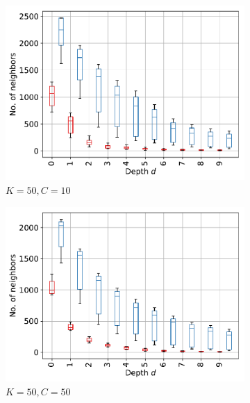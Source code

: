 \documentclass[11pt,onecolumn]{article}
\begin{document}
\begin{figure}[h!]
    \centering
    \begin{subfigure}[t]{0.24\textwidth}
        \centering
        \includegraphics[width=\linewidth]{fig/chains_hist_k50c10d10.pdf}
        \caption{$K=50, C=10$}
    \end{subfigure}
    \hfill
    \begin{subfigure}[t]{0.24\textwidth}
        \centering
        \includegraphics[width=\linewidth]{fig/chains_hist_k50c50d10.pdf}
        \caption{$K=50, C=50$}
    \end{subfigure}
		\hfill
    \begin{subfigure}[t]{0.24\textwidth}
        \centering

\end{subfigure}
\end{figure}
\end{document}
